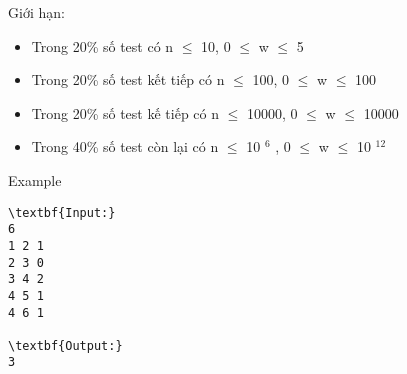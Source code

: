 Giới hạn:
\begin{itemize}
	\item Trong 20\% số test có n  $\le$  10, 0  $\le$  w  $\le$  5
	\item Trong 20\% số test kết tiếp có n  $\le$  100, 0  $\le$  w  $\le$  100
	\item Trong 20\% số test kế tiếp có n  $\le$  10000, 0  $\le$  w  $\le$  10000
	\item Trong 40\% số test còn lại có n  $\le$  10 $^ 6 $ , 0  $\le$  w  $\le$  10 $^ 12 $
\end{itemize}
Example
\begin{verbatim}
\textbf{Input:}
6
1 2 1
2 3 0
3 4 2
4 5 1
4 6 1

\textbf{Output:}
3\end{verbatim}